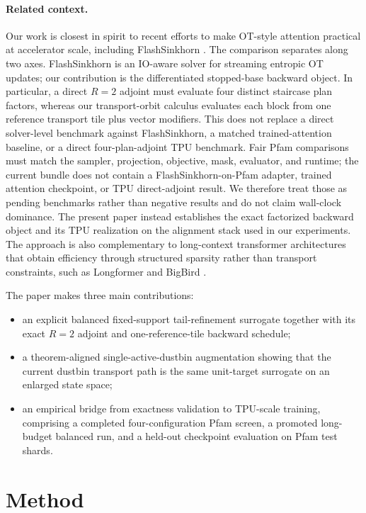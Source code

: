 \paragraph{Related context.}
Our work is closest in spirit to recent efforts to make OT-style attention practical at accelerator scale, including FlashSinkhorn \citep{flashsinkhorn2026}. The comparison separates along two axes. FlashSinkhorn is an IO-aware solver for streaming entropic OT updates; our contribution is the differentiated stopped-base backward object. In particular, a direct $R=2$ adjoint must evaluate four distinct staircase plan factors, whereas our transport-orbit calculus evaluates each block from one reference transport tile plus vector modifiers. This does not replace a direct solver-level benchmark against FlashSinkhorn, a matched trained-attention baseline, or a direct four-plan-adjoint TPU benchmark. Fair Pfam comparisons must match the sampler, projection, objective, mask, evaluator, and runtime; the current bundle does not contain a FlashSinkhorn-on-Pfam adapter, trained attention checkpoint, or TPU direct-adjoint result. We therefore treat those as pending benchmarks rather than negative results and do not claim wall-clock dominance. The present paper instead establishes the exact factorized backward object and its TPU realization on the alignment stack used in our experiments. The approach is also complementary to long-context transformer architectures that obtain efficiency through structured sparsity rather than transport constraints, such as Longformer \citep{beltagy2020longformer} and BigBird \citep{zaheer2020bigbird}.

The paper makes three main contributions:
\begin{itemize}
    \item an explicit balanced fixed-support tail-refinement surrogate together with its exact $R=2$ adjoint and one-reference-tile backward schedule;
    \item a theorem-aligned single-active-dustbin augmentation showing that the current dustbin transport path is the same unit-target surrogate on an enlarged state space;
    \item an empirical bridge from exactness validation to TPU-scale training, comprising a completed four-configuration Pfam screen, a promoted long-budget balanced run, and a held-out checkpoint evaluation on Pfam test shards.
\end{itemize}

\section{Method}

